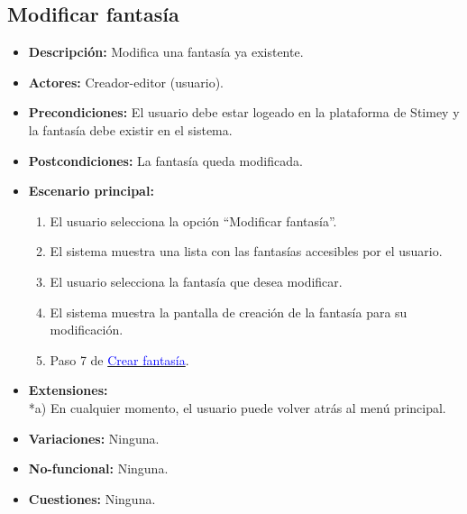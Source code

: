 \documentclass[12pt,letterpaper]{article}
\begin{document}
\subsection{Modificar fantasía}
\begin{itemize}
	\item \textbf{Descripción:} Modifica una fantasía ya existente.
	\item \textbf{Actores:} Creador-editor (usuario).
	\item \textbf{Precondiciones:} El usuario debe estar logeado en la plataforma de Stimey y la fantasía debe existir en el sistema.
	\item \textbf{Postcondiciones:} La fantasía queda modificada. %
	\item \textbf{Escenario principal:}
	\begin{enumerate}
		\item El usuario selecciona la opción ``Modificar fantasía''.
		\item El sistema muestra una lista con las fantasías accesibles por el usuario.
		\item El usuario selecciona la fantasía que desea modificar.
		\item El sistema muestra la pantalla de creación de la fantasía para su modificación.
		\item Paso 7 de \hyperlink{crearfantasia}{\textcolor{blue}{Crear fantasía}}.
	\end{enumerate}
	\item \textbf{Extensiones:} \\ *a) En cualquier momento, el usuario puede volver atrás al menú principal.
	\item \textbf{Variaciones:} Ninguna.
	\item \textbf{No-funcional:} Ninguna.
	\item \textbf{Cuestiones:} Ninguna.
\end{itemize}
\end{document}
